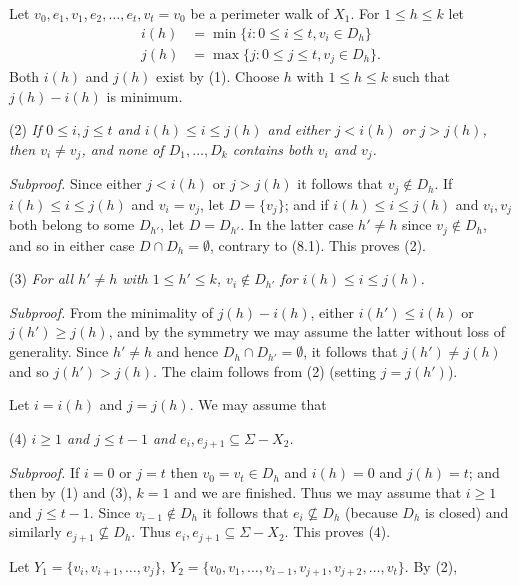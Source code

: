 Let $v_0, e_1, v_1, e_2, \dots, e_t, v_t = v_0$ be a perimeter walk of $X_1$. For $1 \le h \le k$ let
\begin{align*}
i(h) &= \min \{i : 0 \le i \le t, v_i \in D_h\} \\
j(h) &= \max \{j : 0 \le j \le t, v_j \in D_h\}.
\end{align*}
Both $i(h)$ and $j(h)$ exist by (1). Choose $h$ with $1 \le h \le k$ such that $j(h) - i(h)$ is minimum.

\hspace*{12pt}(2) \textit{If $0 \le i, j \le t$ and $i(h) \le i \le j(h)$ and either $j < i(h)$ or $j > j(h)$, then $v_i \ne v_j$, and none of $D_1, \dots, D_k$ contains both $v_i$ and $v_j$.}

\textit{Subproof.} Since either $j < i(h)$ or $j > j(h)$ it follows that $v_j \notin D_h$. If $i(h) \le i \le j(h)$ and $v_i = v_j$, let $D = \{v_j\}$; and if $i(h) \le i \le j(h)$ and $v_i, v_j$ both belong to some $D_{h'}$, let $D = D_{h'}$. In the latter case $h' \ne h$ since $v_j \notin D_h$, and so in either case $D \cap D_h = \emptyset$, contrary to (8.1). This proves (2).

\hspace*{12pt}(3) \textit{For all $h' \ne h$ with $1 \le h' \le k$, $v_i \notin D_{h'}$ for $i(h) \le i \le j(h)$.}

\textit{Subproof.} From the minimality of $j(h) - i(h)$, either $i(h') \le i(h)$ or $j(h') \ge j(h)$, and by the symmetry we may assume the latter without loss of generality. Since $h' \ne h$ and hence $D_h \cap D_{h'} = \emptyset$, it follows that $j(h') \ne j(h)$ and so $j(h') > j(h)$. The claim follows from (2) (setting $j = j(h')$).

Let $i = i(h)$ and $j = j(h)$. We may assume that

\hspace*{12pt}(4) \textit{$i \ge 1$ and $j \le t - 1$ and $e_i, e_{j+1} \subseteq \Sigma - X_2$.}

\textit{Subproof.} If $i = 0$ or $j = t$ then $v_0 = v_t \in D_h$ and $i(h) = 0$ and $j(h) = t$; and then by (1) and (3), $k = 1$ and we are finished. Thus we may assume that $i \ge 1$ and $j \le t - 1$. Since $v_{i-1} \notin D_h$ it follows that $e_i \nsubseteq D_h$ (because $D_h$ is closed) and similarly $e_{j+1} \nsubseteq D_h$. Thus $e_i, e_{j+1} \subseteq \Sigma - X_2$. This proves (4).

Let $Y_1 = \{v_i, v_{i+1}, \dots, v_j\}$, $Y_2 = \{v_0, v_1, \dots, v_{i-1}, v_{j+1}, v_{j+2}, \dots, v_t\}$. By (2),

